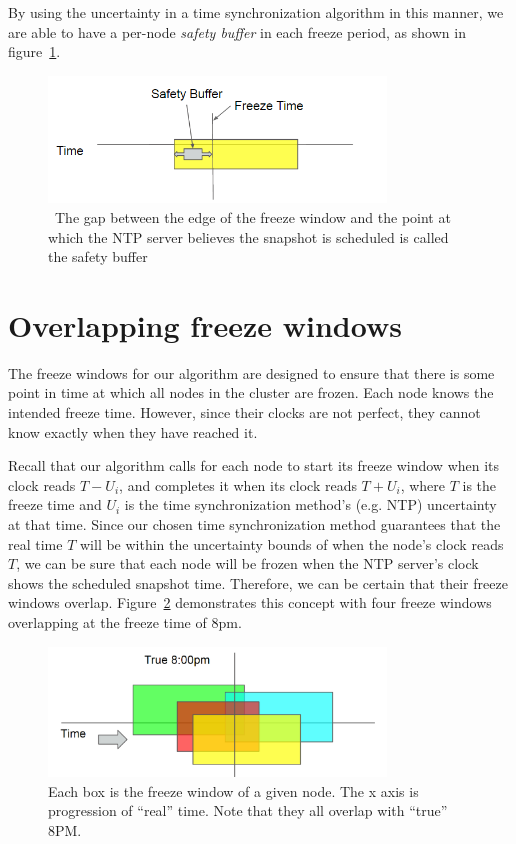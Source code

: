 By using the uncertainty in a time synchronization algorithm in this
manner, we are able to have a per-node \textit{safety buffer} in each
freeze period, as shown in figure~\ref{fig:safety-buff}.

\begin{figure}
\includegraphics[width=0.8\textwidth]{safety-diagram.png}
\caption{~The gap between the edge of the freeze window and the point at which the NTP server believes the snapshot is scheduled is called the safety buffer}
\label{fig:safety-buff}
\end{figure}

\section{Overlapping freeze windows}

The freeze windows for our algorithm are designed to ensure
that there is some point in time at which all nodes in the cluster are
frozen. Each node knows the intended freeze time. However, since their
clocks are not perfect, they cannot know exactly when they have reached it.

Recall that our algorithm calls for each node to start its freeze
window when its clock reads $T - U_i$, and completes it when its clock
reads $T + U_i$, where $T$ is the freeze time and $U_i$ is the time
synchronization method's (e.g. NTP) uncertainty at that time.  Since
our chosen time synchronization method guarantees that the real time
$T$ will be within the uncertainty bounds of when the node's clock
reads $T$, we can be sure that each node will be frozen when the NTP
server's clock shows the scheduled snapshot time. Therefore, we can be
certain that their freeze windows overlap.
Figure~\ref{fig:overlapping-windows} demonstrates this concept with
four freeze windows overlapping at the freeze time of 8pm.

\begin{figure}[h]
  \centering
  \caption{ Each box is the freeze window of a given node. The x axis is progression of “real” time. Note that they all overlap with “true” 8PM.}
  \label{fig:overlapping-windows}
  \includegraphics[width=0.8\textwidth]{overlapping-windows.png}
\end{figure}
